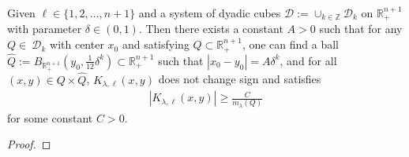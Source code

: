 \documentclass[12pt]{amsart}
\begin{document}
\begin{lemma}\label{sign}
Given $\ell\in\{1,2,\ldots,n+1\}$ and a
system of dyadic cubes $\mathcal{D}
    := \cup_{k\in\mathbb{Z}}\mathcal{D}_{k}$ on $\mathbb{R}_+^{n+1}$ with parameter $\delta\in (0,1)$. Then there exists a constant  $A>0$ such that for any $Q\in \ \mathcal{D}_{k}$ with center $x_{0}$ and satisfying $Q\subset \mathbb{R}_{+}^{n+1}$, one can find a ball $\hat{Q}:=B_{\mathbb{R}_{+}^{n+1}}(y_0,\frac{1}{12}\delta^k)\subset \mathbb{R}_{+}^{n+1}$ such that $|x_{0}-y_{0}|=A\delta^k$, and for all $(x,y)\in Q\times\hat{Q}$, $K_{\lambda,\ell}(x,y)$ does not change sign and satisfies
\begin{align*}
|K_{\lambda,\ell}(x,y)|\geq \frac{C}{m_\lambda(Q)}
\end{align*}
for some constant $C>0$.
\begin{proof}

\end{proof}
%
\end{lemma}
%
\end{document}
